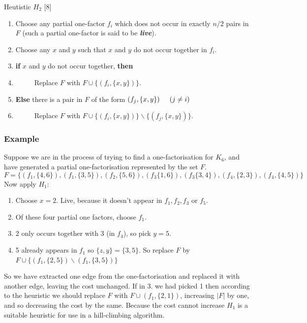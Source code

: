 \documentclass[
  12pt,
  a4paper]{book}
\begin{document}
Heutistic \(H_2\) {[}8{]}

\begin{enumerate}
\def\labelenumi{\arabic{enumi}.}
\item
  Choose any partial one-factor \(f_i\) which does not occur in exactly
  \(n/2\) pairs in \(F\) (such a partial one-factor is said to be
  \textbf{\emph{live}}).
\item
  Choose any \(x\) and \(y\) such that \(x\) and \(y\) do not occur
  together in \(f_i\).
\item
  \textbf{if} \(x\) and \(y\) do not occur together, \textbf{then}
\item
  \(\hspace{1cm}\) Replace \(F\) with \(F \cup \{(f_i,\{x,y\})\}\).
\item
  \textbf{Else} there is a pair in \(F\) of the form
  \((f_j,\{x,y\}) \hspace{0.5cm} (j \neq i)\)
\item
  \(\hspace{1cm}\) Replace \(F\) with
  \(F \cup \{(f_i,\{x,y\})\} \backslash  \{(f_j,\{x,y\})\}\).
\end{enumerate}

\hypertarget{example-1}{%
\subsubsection{Example}\label{example-1}}

Suppose we are in the process of trying to find a one-factorisation for
\(K_6\), and have generated a partial one-factorisation represented by
the set \(F\).
\[F=\{(f_1,\{4,6\}),(f_1,\{3,5\}),(f_2,\{5,6\}),(f_3\{1,6\}), (f_3\{3,4\}),(f_4,\{2,3\}),(f_4,\{4,5\})\}\]
Now apply \(H_1\):

\begin{enumerate}
\def\labelenumi{\arabic{enumi}.}
\item
  Choose \(x=2\). Live, because it doesn't appear in \(f_1,f_2,f_3\) or
  \(f_5\).
\item
  Of these four partial one factors, choose \(f_1\).
\item
  2 only occurs together with 3 (in \(f_4\)), so pick \(y=5\).
\item
  5 already appears in \(f_1\) so \(\{z,y\}=\{3,5\}\). So replace \(F\)
  by \(F \cup \{(f_1,\{2,5\}) \backslash (f_1,\{3,5\})\}\)
\end{enumerate}

So we have extracted one edge from the one-factorisation and replaced it
with another edge, leaving the cost unchanged. If in 3. we had picked 1
then according to the heuristic we should replace \(F\) with
\(F \cup (f_1,\{2,1\})\), increasing \(|F|\) by one, and so decreasing
the cost by the same. Because the cost cannot increase \(H_1\) is a
suitable heuristic for use in a hill-climbing algorithm.
\end{document}
